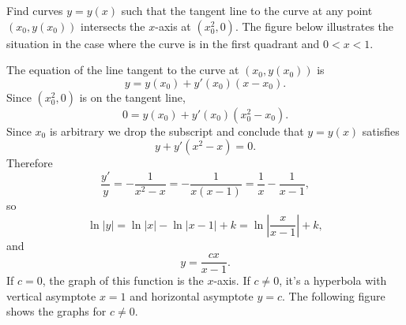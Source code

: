\documentclass{ximera}
\begin{document}
\begin{example}\label{example:4.5.8}
Find curves $y=y(x)$ such that the tangent line to the curve at any
point $(x_0,y(x_0))$ intersects the $x$-axis at $(x^2_0,0)$.
The figure below illustrates the situation in the case where
the curve is in the first quadrant and $0<x<1$.

\begin{center}
\end{center}
 
 
\begin{explanation}
The equation of the line tangent to the curve at $(x_0,y(x_0))$ is
$$
y=y(x_0)+y'(x_0)(x-x_0).
$$
Since $(x^2_0,0)$ is on the tangent line,
$$
0=y(x_0)+y'(x_0)(x^2_0-x_0).
$$
Since $x_0$ is arbitrary we drop the subscript and conclude that
$y=y(x)$ satisfies
$$
y+y'(x^2-x)=0.
$$
Therefore
$$
\frac{y'}{y}=-\frac{1}{x^2-x}=-\frac{1}{x(x-1)}=\frac{1}{x}-\frac{1}{x-1},
$$
so
$$
\ln|y|=\ln|x|-\ln|x-1|+k=
\ln\left|\frac{x}{x-1}\right|+k,
$$
and
$$
y=\frac{cx}{x-1}.
$$
If $c=0$, the graph of this function is the $x$-axis.   If $c\neq 0$, it's
a hyperbola with vertical asymptote $x=1$ and horizontal asymptote
$y=c$. The following figure shows the graphs for $c\neq 0$.

\begin{center}
\end{center}



\end{explanation}
\end{example}
 
\end{document}
